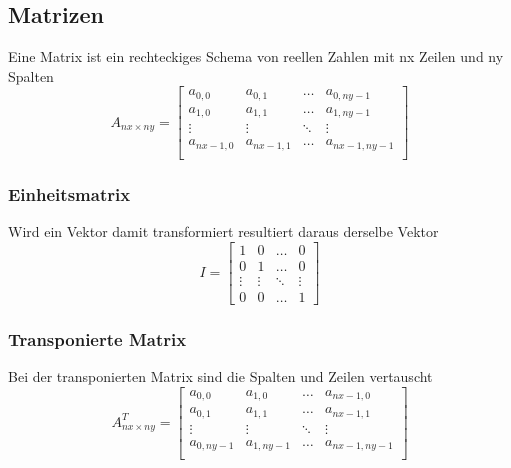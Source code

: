 \documentclass[10pt]{article}
\begin{document}
\subsection{Matrizen}
Eine Matrix ist ein rechteckiges Schema von reellen Zahlen mit nx Zeilen und ny Spalten
\begin{equation}
A_{nx \times ny} = 
\begin{bmatrix}
	a_{0,0} & a_{0,1} & \dots & a_{0,ny-1} \\
	a_{1,0} & a_{1,1} & \dots & a_{1,ny-1} \\
	\vdots & \vdots & \ddots & \vdots \\
	a_{nx-1,0} & a_{nx-1,1} & \dots & a_{nx-1,ny-1} \\
\end{bmatrix}
\end{equation}
\subsubsection{Einheitsmatrix}
Wird ein Vektor damit transformiert resultiert daraus derselbe Vektor
\begin{equation}
I=
\begin{bmatrix}
 1 & 0 & \dots & 0 \\
 0 & 1 & \dots & 0 \\
 \vdots & \vdots & \ddots & \vdots \\
 0 & 0 & \dots & 1
\end{bmatrix}
\end{equation}
\subsubsection{Transponierte Matrix}
Bei der transponierten Matrix sind die Spalten und Zeilen vertauscht
\begin{equation}
A_{nx \times ny}^T = 
\begin{bmatrix}
	a_{0,0} & a_{1,0} & \dots & a_{nx-1,0} \\
	a_{0,1} & a_{1,1} & \dots & a_{nx-1,1} \\
	\vdots & \vdots & \ddots & \vdots \\
	a_{0,ny-1} & a_{1,ny-1} & \dots & a_{nx-1,ny-1} \\
\end{bmatrix}
\end{equation}
\end{document}
